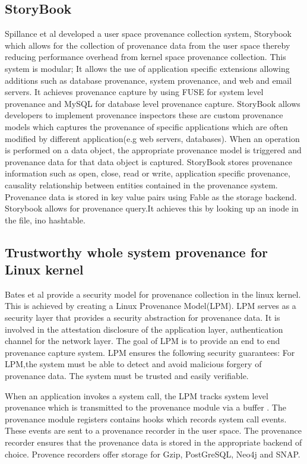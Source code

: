 \subsection{StoryBook}
Spillance et al developed a user space provenance collection system, Storybook which allows for the collection of provenance data from the user space thereby reducing performance overhead from kernel space provenance collection. This system is modular; It allows the use of application specific extensions allowing additions such as database provenance, system provenance, and web and email servers. It achieves provenance capture by using FUSE for system level provenance and MySQL for database level provenance capture. StoryBook allows developers to implement provenance inspectors these are custom provenance models which captures the provenance of specific applications which are often modified by different application(e.g web servers, databases). When an operation is performed on a data object, the appropriate provenance model is triggered and provenance data for that data object is captured. StoryBook stores provenance information such as open, close, read or write, application specific provenance, causality relationship between entities contained in the provenance system. Provenance data is stored in key value pairs using Fable as the storage backend. Storybook allows for provenance query.It achieves this by looking up an inode in the file, ino hashtable.

\subsection{Trustworthy whole system provenance for Linux kernel}

Bates et al provide a security model for provenance collection in the linux kernel. This is achieved by creating a Linux Provenance Model(LPM). LPM serves as a security layer that provides a security abstraction for provenance data. It is involved in the attestation disclosure of the application layer, authentication channel for the network layer. The goal of LPM is to provide an end to end provenance capture system. LPM ensures the following security guarantees: For LPM,the system must be able to detect and avoid malicious forgery of provenance data. The system must be trusted and easily verifiable. \par When an application invokes a system call, the LPM tracks system level provenance which is transmitted to the provenance module via a buffer . The provenance module registers contains hooks which records system call events. These events are sent to a provenance recorder in the user space. The provenance recorder ensures that the provenance data is stored in the appropriate backend of choice. Provence recorders offer storage for Gzip, PostGreSQL, Neo4j and SNAP.




